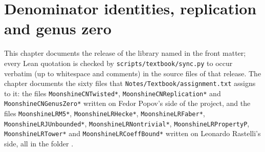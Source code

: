 \chapter{Denominator identities, replication and genus zero}\label{ch:19}

\providecommand{\chnineteenH}{\mathbb{H}}
\providecommand{\chnineteenR}{\mathbb{R}}
\providecommand{\chnineteenSL}{\mathrm{SL}_2(\mathbb{Z})}
\providecommand{\chnineteenSLR}{\mathrm{SL}_2(\mathbb{R})}
\providecommand{\chnineteenGLR}{\mathrm{GL}_2(\mathbb{R})}
\providecommand{\chnineteenP}{\mathbb{P}^1}
\providecommand{\chnineteenm}{\mathfrak{m}}
\providecommand{\chnineteenu}{\mathfrak{u}}
\providecommand{\chnineteenmat}[4]{\left(\begin{smallmatrix}#1&#2\\#3&#4\end{smallmatrix}\right)}
\providecommand{\chnineteenlean}[1]{\texttt{\directlua{ local s = "\luaescapestring{\detokenize{#1}}" for piece, sep in string.gmatch(s, "([^_.]*)([_.]?)") do if not (piece == "" and sep == "") then tex.sprint(-2, piece .. sep) if not (sep == "") then tex.sprint(string.char(92) .. "allowbreak{}") end end end}}}
\begingroup\setlength{\emergencystretch}{3em}\sloppy

This chapter documents the release of the library named in the front matter; every Lean quotation is checked by
\texttt{scripts/textbook/sync.py} to occur verbatim (up to whitespace and comments) in the source files of that
release.  The chapter documents the sixty files that \texttt{Notes/Textbook/assignment.txt} assigns to it: the files
\texttt{MoonshineCNTwisted*}, \texttt{MoonshineCNReplication*} and \texttt{MoonshineCNGenusZero*} written on Fedor
Popov's side of the project, and the files \texttt{MoonshineLRM5*}, \texttt{MoonshineLRHecke*},
\texttt{MoonshineLRFaber*}, \texttt{MoonshineLRJUnbounded*}, \texttt{MoonshineLRNontrivial*},
\texttt{MoonshineLRPropertyP}, \texttt{MoonshineLRTower*} and \texttt{MoonshineLRCoeffBound*} written on Leonardo
Rastelli's side, all in the folder .

